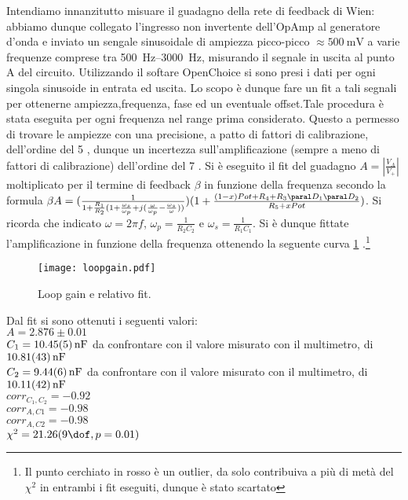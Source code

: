 Intendiamo innanzitutto misuare il guadagno della rete di feedback di Wien: abbiamo dunque collegato l'ingresso
non invertente dell'OpAmp al generatore d'onda e inviato un sengale sinusoidale di ampiezza picco-picco $\approx \SI{500}{\mV}$
a varie frequenze comprese tra \SIrange[range-phrase = \text{ e }]{500}{3000}{\Hz},
misurando il segnale in uscita al punto A del circuito. Utilizzando il softare OpenChoice si sono presi i dati per ogni singola sinusoide in entrata ed uscita. Lo scopo è dunque fare un fit a tali segnali per ottenerne ampiezza,frequenza, fase ed un eventuale offset.Tale procedura è stata eseguita per ogni frequenza nel range prima considerato. Questo a permesso di trovare le ampiezze con una precisione, a patto di fattori di calibrazione, dell'ordine del 5 \textperthousand , dunque un incertezza sull'amplificazione (sempre a meno di fattori di calibrazione) dell'ordine del 7 \textperthousand.
Si è eseguito il fit del guadagno $A=\left | \frac{V_A}{V_+} \right | $ moltiplicato per il termine di feedback $\beta$ in funzione della frequenza secondo la formula $\beta A= (\frac{1}{1+\frac{R_1}{R_2}(1+\frac{\omega_s}{\omega_p}+j(\frac{\omega}{\omega_p}-\frac{\omega_s}{\omega} ))})(1 + \frac{(1-x)Pot+R_4+R_3 \paral D_1 \paral D_2}{R_5+xPot})$. Si ricorda che indicato $\omega=2 \pi f$, $\omega_p= \frac{1}{R_2C_2}$ e $\omega_s=\frac{1}{R_1C_1}$. Si è dunque fittate l'amplificazione in funzione della frequenza ottenendo la seguente curva \ref{f:lpgn} .\footnote{Il punto cerchiato in rosso è un outlier, da solo contribuiva a più di metà del $\chi^2$ in entrambi i fit eseguiti, dunque è stato scartato}


\begin{figure}[h]
	\centering
	\texttt{[image: loopgain.pdf]}
	\caption{Loop gain e relativo fit.}
	\label{f:lpgn}
\end{figure}

Dal fit si sono ottenuti i seguenti valori:\\
$A=2.876 \pm 0.01$\\
$C_1=\SI{10.45 \pm 0.05}{nF}$ da confrontare con il valore misurato con il multimetro, di $\SI{10.81\pm 0.43}{nF}$\\
$C_2=\SI{9.44\pm 0.06}{nF}$ da confrontare con il valore misurato con il multimetro, di $\SI{10.11\pm 0.42}{nF}$\\
$corr_{C_1, C_2}=-0.92$\\
$corr_{A,C1}=-0.98$\\
$corr_{A,C2}=-0.98$\\
$\chi^2=21.26 (9 \dof, p = 0.01)$

